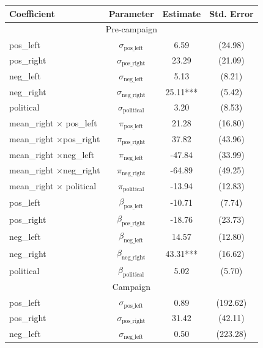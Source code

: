 \documentclass[12pt]{article}
\begin{document}
\begin{table}[ht]

		\centering
	\begin{threeparttable}

	\begin{tabular}{lccc}
		\hline
		\textbf{Coefficient} & \textbf{Parameter} & \textbf{Estimate} & \textbf{Std. Error} \\
		\hline
		\hline
		\multicolumn{4}{c}{{Pre-campaign}} \\
		\hline
		\hline
		pos\_left & $ \sigma_{\text{pos\_left}} $ & 6.59 & (24.98) \\
		pos\_right & $ \sigma_{\text{pos\_right}} $ & 23.29 & (21.09) \\
		neg\_left & $ \sigma_{\text{neg\_left}} $ & 5.13 & (8.21) \\
		neg\_right & $ \sigma_{\text{neg\_right}} $ & 25.11*** & (5.42) \\
		political & $ \sigma_{\text{political}} $ & 3.20 & (8.53) \\
		\hline
		mean\_right $\times $ pos\_left & $ \pi_{\text{pos\_left}} $ & 21.28 & (16.80) \\
		mean\_right $\times $pos\_right & $ \pi_{\text{pos\_right}} $ & 37.82 & (43.96) \\
		mean\_right $\times $neg\_left & $ \pi_{\text{neg\_left}} $ & -47.84 & (33.99) \\
		mean\_right $\times $neg\_right & $ \pi_{\text{neg\_right}} $ & -64.89 & (49.25) \\
		mean\_right $\times $ political & $ \pi_{\text{political}} $ & -13.94 & (12.83) \\
		\hline
		pos\_left & $ \beta_{\text{pos\_left}} $ & -10.71 & (7.74) \\
		pos\_right & $ \beta_{\text{pos\_right}} $ & -18.76 & (23.73) \\
		neg\_left & $ \beta_{\text{neg\_left}} $ & 14.57 & (12.80) \\
		neg\_right & $ \beta_{\text{neg\_right}} $ & 43.31*** & (16.62) \\
		political & $ \beta_{\text{political}} $ & 5.02 & (5.70) \\
		\hline
		\hline
		\multicolumn{4}{c}{{Campaign}} \\
		\hline
		\hline
		pos\_left & $ \sigma_{\text{pos\_left}} $ & 0.89 & (192.62) \\
		pos\_right & $ \sigma_{\text{pos\_right}} $ & 31.42 & (42.11) \\
		neg\_left & $ \sigma_{\text{neg\_left}} $ & 0.50 & (223.28) \\

\end{tabular}
\end{threeparttable}
\end{table}
\end{document}
